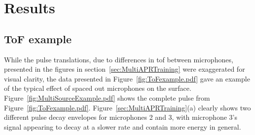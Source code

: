\section{Results}\label{sec:MultiAPRResults}
\subsection{ToF example}
While the pulse translations, due to differences in \DIFdelbegin {}\DIFdelend \DIFaddbegin \gls{tof} \DIFaddend between microphones, presented in the figures in section~\ref{sec:MultiAPRTraining} were exaggerated for visual clarity, the data presented in Figure~\ref{fig:ToFexample.pdf} gave an example of the typical effect of spaced out microphones on the surface. Figure~\ref{fig:MultiSourceExample.pdf} shows the complete pulse from Figure~\ref{fig:ToFexample.pdf}. Figure~\ref{sec:MultiAPRTraining}(a) clearly shows two different pulse decay envelopes for microphones 2 and 3, with microphone 3's signal appearing to decay at a slower rate and contain more energy in general.

